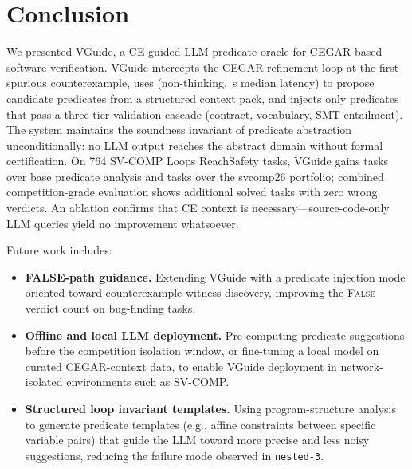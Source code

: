 \section{Conclusion}
\label{sec:conclusion}

We presented VGuide, a CE-guided LLM predicate oracle for CEGAR-based software
verification. VGuide intercepts the CEGAR refinement loop at the first spurious
counterexample, uses \LLMName{} (non-thinking, \LLMLatencyMedian{}\,s median latency)
to propose candidate predicates from a structured context pack, and injects only
predicates that pass a three-tier validation cascade (contract, vocabulary, SMT
entailment). The system maintains the soundness invariant of predicate abstraction
unconditionally: no LLM output reaches the abstract domain without formal certification.
On 764 SV-COMP Loops ReachSafety tasks, VGuide gains \LoopsDelta{} tasks over
base predicate analysis and \PortfolioLoopsDelta{} tasks over the svcomp26 portfolio;
combined competition-grade evaluation shows \CompTotalDelta{} additional solved tasks
with zero wrong verdicts. An ablation confirms that CE context is necessary---source-code-only
LLM queries yield no improvement whatsoever.

Future work includes:
\begin{itemize}
  \item \textbf{FALSE-path guidance.} Extending VGuide with a predicate injection
        mode oriented toward counterexample witness discovery, improving the
        \textsc{False} verdict count on bug-finding tasks.
  \item \textbf{Offline and local LLM deployment.} Pre-computing predicate suggestions
        before the competition isolation window, or fine-tuning a local model on
        curated CEGAR-context data, to enable VGuide deployment in network-isolated
        environments such as SV-COMP.
  \item \textbf{Structured loop invariant templates.} Using program-structure analysis
        to generate predicate templates (e.g., affine constraints between specific
        variable pairs) that guide the LLM toward more precise and less noisy
        suggestions, reducing the failure mode observed in \texttt{nested-3}.
\end{itemize}

